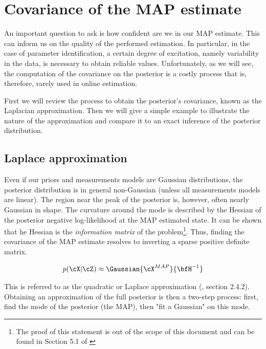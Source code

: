 \appendix




\chapter{Covariance of the MAP estimate}
\label{chp:MAP_covariance}
An important question to ask is how confident are we in our MAP estimate.
This can inform us on the quality of the performed estimation. In particular, in the case of parameter identification, a certain degree of excitation,
namely variability in the data, is necessary to obtain reliable values. Unfortunately, as we will see, the computation of the covariance on the posterior
is a costly process that is, therefore, rarely used in online estimation.

First we will review the process to obtain the posterior's covariance, known as the Laplacian approximation. Then we will give a simple example to
illustrate the nature of the approximation and compare it to an exact inference of the posterior distribution.

\section{Laplace approximation}
\label{sec:map_covariance}
Even if our priors and measurements models are Gaussian distributions, the posterior distribution
is in general non-Gaussian (unless all measurements models are linear). The region near the peak of the posterior is, however, often nearly Gaussian in shape.
The curvature around the mode is described by the Hessian of the posterior negative log-likelihood at the MAP estimated state. 
It can be shown that he Hessian is the \textit{information matrix} of the problem\footnote{The proof of this statement is out of the scope of this document and can be found in Section 5.1 of
\cite{peng2018advanced}}. Thus, finding the covariance of the MAP estimate resolves to inverting a 
sparse positive definite matrix.

\begin{equation}
    p(\cX | \cZ) \approx \Gaussian{\cX^{MAP}}{\bfH^{-1}}
    \label{eq:map_laplace}
\end{equation}

This is referred to as the quadratic or Laplace approximation (\cite{mcelreath2018statistical}, section 2.4.2). Obtaining an approximation of the full posterior is then a two-step process: 
first, find the mode of the posterior (the MAP), then "fit a Gaussian" on this mode. 

